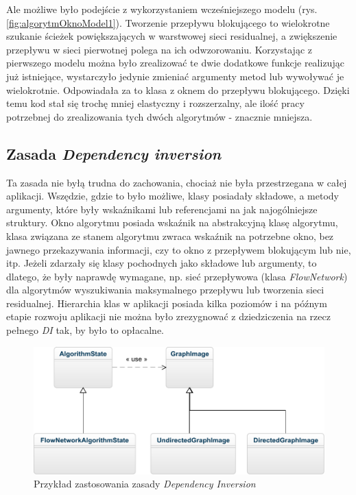 Ale możliwe było podejście z wykorzystaniem wcześniejszego modelu (rys. \ref{fig:algorytmOknoModel1}). Tworzenie przepływu blokującego to wielokrotne szukanie ścieżek powiększających w warstwowej sieci residualnej, a zwiększenie przepływu w sieci pierwotnej polega na ich odwzorowaniu. Korzystając z pierwszego modelu można było zrealizować te dwie dodatkowe funkcje realizując już istniejące, wystarczyło jedynie zmieniać argumenty metod lub wywoływać je wielokrotnie. Odpowiadała za to klasa z oknem do przepływu blokującego. Dzięki temu kod stał się trochę mniej elastyczny i rozszerzalny, ale ilość pracy potrzebnej do zrealizowania tych dwóch algorytmów - znacznie mniejsza.
\subsection{Zasada \textit{Dependency inversion}}
Ta zasada nie byłą trudna do zachowania, chociaż nie była przestrzegana w całej aplikacji. Wszędzie, gdzie to było możliwe, klasy posiadały składowe, a metody argumenty, które były wskaźnikami lub referencjami na jak najogólniejsze struktury. Okno algorytmu posiada wskaźnik na abstrakcyjną klasę algorytmu, klasa związana ze stanem algorytmu zwraca wskaźnik na potrzebne okno, bez jawnego przekazywania informacji, czy to okno z przepływem blokującym lub nie, itp. Jeżeli zdarzały się klasy pochodnych jako składowe lub argumenty, to dlatego, że były naprawdę wymagane, np. sieć przepływowa (klasa \emph{FlowNetwork}) dla algorytmów wyszukiwania maksymalnego przepływu lub tworzenia sieci residualnej. Hierarchia klas w aplikacji posiada kilka poziomów i na późnym etapie rozwoju aplikacji nie można było zrezygnować z dziedziczenia na rzecz pełnego \emph{DI} tak, by było to opłacalne.
\begin{figure}[H]
	\centering
	\includegraphics[width=0.8\linewidth]{./img/SOLD_DI.pdf}
	\caption{Przykład zastosowania zasady \textit{Dependency Inversion}}
	\label{fig:SOLD_DI}
\end{figure}